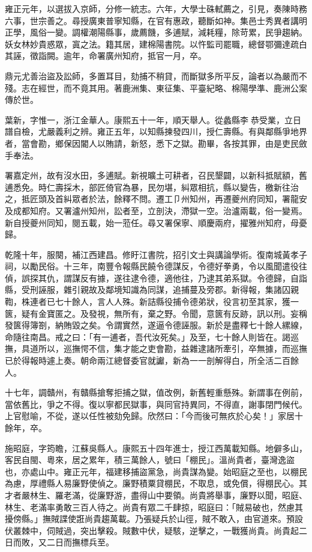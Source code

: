 \begin{pinyinscope}
雍正元年，以選拔入京師，分修一統志。六年，大學士硃軾薦之，引見，奏陳時務六事，世宗善之。尋授廣東普寧知縣，在官有惠政，聽斷如神。集邑士秀異者講明正學，風俗一變。調權潮陽縣事，歲薦饑，多逋賦，減耗糧，除苛累，民爭趨納。妖女林妙貴惑眾，寘之法。籍其居，建棉陽書院。以忤監司罷職，總督鄂彌達疏白其誣，徵詣闕。逾年，命署廣州知府，抵官一月，卒。

鼎元尤善治盜及訟師，多置耳目，劾捕不稍貸，而斷獄多所平反，論者以為嚴而不殘。志在經世，而不竟其用。著鹿洲集、東征集、平臺紀略、棉陽學準、鹿洲公案傳於世。

葉新，字惟一，浙江金華人。康熙五十一年，順天舉人。從蠡縣李恭受業，立日譜自檢，尤嚴義利之辨。雍正五年，以知縣揀發四川，授仁壽縣。有與鄰縣爭地界者，當會勘，鄉保因閽人以賄請，新怒，悉下之獄。勘畢，各按其罪，由是吏民斂手奉法。

署嘉定州，故有沒水田，多逋賦。新視曠土可耕者，召民墾闢，以新科抵賦額，舊逋悉免。時仁壽採木，部匠倚官為暴，民勿堪，糾眾相抗，縣以變告，檄新往治之，抵匠頭及首糾眾者於法，餘釋不問。遷工⼙州知州，再遷夔州府同知，署龍安及成都知府。又署瀘州知州，訟者至，立剖決，滯獄一空。治瀘兩載，俗一變焉。新自授夔州同知，閱五載，始一蒞任。尋又署保寧、順慶兩府，擢雅州知府，母憂歸。

乾隆十年，服闋，補江西建昌。修盱江書院，招引文士與講論學術。復南城黃孝子祠，以勵民俗。十三年，南豐令報縣民饒令德謀反，令德好拳勇，令以風聞遣役往偵，誤探其仇，謂謀反有據，遂往逮令德，適他往，乃逮其弟系獄。令德歸，自詣縣，受刑誣服，雜引親故及鄰境知識為同謀，追捕蔓及旁郡。新得報，集諸囚親鞫，株連者已七十餘人，言人人殊。新詰縣役捕令德弟狀，役言初至其家，獲一篋，疑有金寶匿之。及發視，無所有，棄之野。令聞，意篋有反跡，訊以刑。妄稱發篋得簿劄，納賄毀之矣。令謂實然，遂逼令德誣服。新於是盡釋七十餘人縲線，命隨往南昌。戒之曰：「有一逋者，吾代汝死矣。」及至，七十餘人則皆在。謁巡撫，具道所以，巡撫愕不信，集才能之吏會勘，益雜逮諸所牽引，卒無據，而巡撫已於得報時遽上奏。朝命兩江總督委官就讞，新為一一剖解得白，所全活二百餘人。

十七年，調贛州，有贛縣搶奪拒捕之獄，值改例，新舊輕重懸殊。新謂事在例前，當依舊比，爭之不得。復以寧都民獄事，與同官持異同，不得直，謝事閉門候代。上官慰喻，不從，遂以任性被劾免歸。欣然曰：「今而後可無疚於心矣！」家居十餘年，卒。

施昭庭，字筠瞻，江蘇吳縣人。康熙五十四年進士，授江西萬載知縣。地僻多山，客民自閩、粵來，居之累年，積三萬餘人，號曰「棚民」。溫尚貴者，臺灣逸盜也，亦處山中。雍正元年，福建移捕盜黨急，尚貴謀為變。始昭庭之至也，以棚民為慮，厚禮縣人易廉野使偵之。廉野積粟貸棚民，不取息，或免償，得棚民心。其才者嚴林生、羅老滿，從廉野游，盡得山中要領。尚貴將舉事，廉野以聞，昭庭、林生、老滿率勇敢三百人待之。尚貴有眾二千肆掠，昭庭曰：「賊易破也，然慮其擾傍縣。」撫賊諜使誑尚貴趨萬載。乃張疑兵於山徑，賊不敢入，由官道來。預設伏叢棘中，伺賊過，突出擊殺。賊數中伏，疑駭，逆擊之，一戰獲尚貴。尚貴起二日而敗，又二日而撫標兵至。


\end{pinyinscope}
